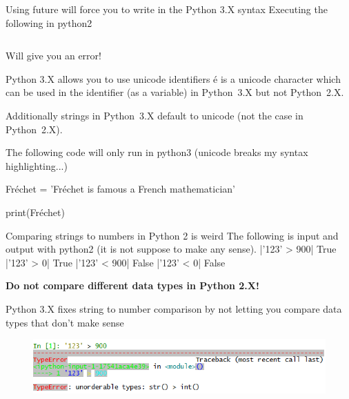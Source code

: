 \documentclass[10pt]{beamer}
\begin{document}
\begin{frame}{Using future will force you to write in the Python 3.X syntax}
Executing the following in python2
\inputminted{python}{code/helloWorldBroke.py}
Will give you an error!
\end{frame}

\begin{frame}{Python 3.X allows you to use unicode identifiers}
\'{e} is a unicode character which can be used in the identifier (as a variable) in Python~3.X but not Python~2.X.

Additionally strings in Python~3.X default to unicode (not the case in Python~2.X).

The following code will only run in python3 (unicode breaks my syntax highlighting...)

Fr\'{e}chet = 'Fr\'{e}chet is famous a French mathematician'

print(Fr\'{e}chet)

\end{frame}

\begin{frame}{Comparing strings to numbers in Python 2 is weird}
The following is input and output with python2 (it is not suppose to make any sense). 
|'123' > 900|
True
|'123' > 0|
True
|'123' < 900|
False
|'123' < 0|
False

\textbf{Do not compare different data types in Python 2.X!}
\end{frame}

\begin{frame}{Python 3.X fixes string to number comparison}
by not letting you compare data types that don't make sense
\begin{figure}
 	\includegraphics[width=1.0\textwidth]{figs/stringToIntPython3.png}
\end{figure}
\end{frame}
\end{document}
